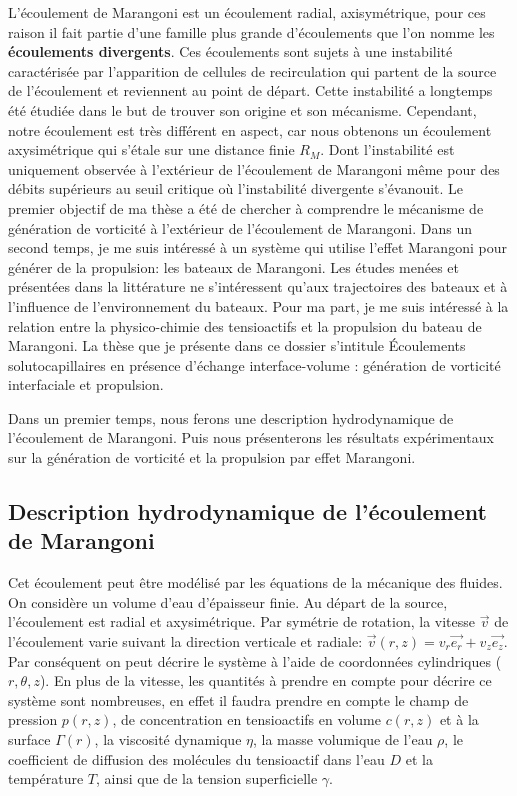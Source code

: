 \documentclass[french, 10pt]{article}
\begin{document}
L'écoulement de Marangoni est un écoulement radial, axisymétrique, pour ces raison il fait partie d'une famille plus grande d'écoulements que l'on nomme les \textbf{écoulements divergents}. Ces écoulements sont sujets à une instabilité caractérisée par l'apparition de cellules de recirculation qui partent de la source de l'écoulement et reviennent au point de départ. Cette instabilité a longtemps été étudiée dans le but de trouver son origine et son mécanisme. Cependant, notre écoulement est très différent en aspect, car nous obtenons un écoulement axysimétrique qui s'étale sur une distance finie $R_M$. Dont l'instabilité est uniquement observée à l'extérieur de l'écoulement de Marangoni même pour des débits supérieurs au seuil critique où l'instabilité divergente s'évanouit. Le premier objectif de ma thèse a été de chercher à comprendre le mécanisme de génération de vorticité à l'extérieur de l'écoulement de Marangoni. Dans un second temps, je me suis intéressé à un système qui utilise l'effet Marangoni pour générer de la propulsion: les bateaux de Marangoni. Les études menées et présentées dans la littérature ne s'intéressent qu'aux trajectoires des bateaux et à l'influence de l'environnement du bateaux. Pour ma part, je me suis intéressé à la relation entre la physico-chimie des tensioactifs et la propulsion du bateau de Marangoni. La thèse que je présente dans ce dossier s'intitule \og{}Écoulements solutocapillaires en présence d'échange interface-volume : génération de vorticité interfaciale et propulsion\fg{}.\medskip

Dans un premier temps, nous ferons une description hydrodynamique de l'écoulement de Marangoni. Puis nous présenterons les résultats expérimentaux sur la génération de vorticité et la propulsion par effet Marangoni.

\subsection{Description hydrodynamique de l'écoulement de Marangoni}

Cet écoulement peut être modélisé par les équations de la mécanique des fluides. On considère un volume d'eau d'épaisseur finie. Au départ de la source, l'écoulement est radial et axysimétrique. Par symétrie de rotation, la vitesse $\vec{v}$ de l'écoulement varie suivant la direction verticale et radiale: $\vec{v}(r,z)=v_r\vec{e_r}+v_{z}\vec{e_z}$. Par conséquent on peut décrire le système à l'aide de coordonnées cylindriques ($r,\theta,z$). En plus de la vitesse, les quantités à prendre en compte pour décrire ce système sont nombreuses, en effet il faudra prendre en compte le champ de pression $p(r,z)$, de concentration en tensioactifs en volume $c(r,z)$ et à la surface $\Gamma(r)$, la viscosité dynamique $\eta$, la masse volumique de l'eau $\rho$, le coefficient de diffusion des molécules du tensioactif dans l'eau $D$ et la température $T$, ainsi que de la tension superficielle $\gamma$.\medskip
\end{document}
